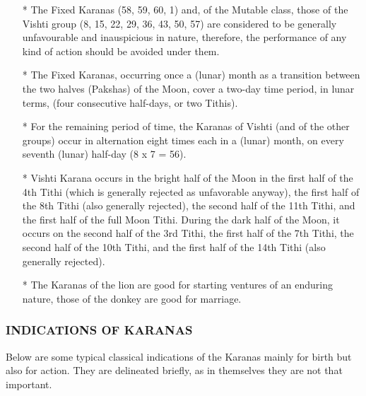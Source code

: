 \begin{enumerate}
\begin{enumerate}
 

\item[*] The Fixed Karanas (58, 59, 60, 1) and, of the Mutable class, those of the Vishti group (8, 15, 22, 29, 36, 43, 50, 57) are considered to be generally unfavourable and inauspicious in nature, therefore, the performance of any kind of action should be avoided under them.

 

\item[*] The Fixed Karanas, occurring once a (lunar) month as a transition between the two halves (Pakshas) of the Moon, cover a two-day time period, in lunar terms, (four consecutive half-days, or two Tithis).

 

\item[*] For the remaining period of time, the Karanas of Vishti (and of the other groups) occur in alternation eight times each in a (lunar) month, on every seventh (lunar) half-day (8 x 7 = 56).

 

\item[*] Vishti Karana occurs in the bright half of the Moon in the first half of the 4th Tithi (which is generally rejected as unfavorable anyway), the first half of the 8th Tithi (also generally rejected), the second half of the 11th Tithi, and the first half of the full Moon Tithi. During the dark half of the Moon, it occurs on the second half of the 3rd Tithi, the first half of the 7th Tithi, the second half of the 10th Tithi, and the first half of the 14th Tithi (also generally rejected).

 

\item[*] The Karanas of the lion are good for starting ventures of an enduring nature, those of the donkey are good for marriage.

 \end{enumerate}

\subsubsection{INDICATIONS OF KARANAS}

 

Below are some typical classical indications of the Karanas mainly for birth but also for action. They are delineated briefly, as in themselves they are not that important.


\end{enumerate}
